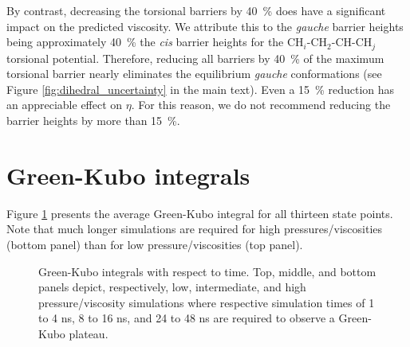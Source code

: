 \documentclass[preprint,review,11pt]{elsarticle}
\begin{document}
	By contrast, decreasing the torsional barriers by 40~\% does have a significant impact on the predicted viscosity. We attribute this to the \textit{gauche} barrier heights being approximately 40~\% the \textit{cis} barrier heights for the CH$_i$-CH$_2$-CH-CH$_j$ torsional potential. Therefore, reducing all barriers by 40~\% of the maximum torsional barrier nearly eliminates the equilibrium \textit{gauche} conformations (see Figure \ref{fig:dihedral_uncertainty} in the main text). Even a 15~\% reduction has an appreciable effect on $\eta$. For this reason, we do not recommend reducing the barrier heights by more than 15~\%.	
	
	\clearpage
	\newpage
	
	\section{Green-Kubo integrals} \label{SI:Running integrals}
		
	Figure \ref{fig:running_integrals} presents the average Green-Kubo integral for all thirteen state points. Note that much longer simulations are required for high pressures/viscosities (bottom panel) than for low pressure/viscosities (top panel). 	
	
	\begin{figure}[htb!]
		\centering
		\caption{Green-Kubo integrals with respect to time. Top, middle, and bottom panels depict, respectively, low, intermediate, and high pressure/viscosity simulations where respective simulation times of 1 to 4 ns, 8 to 16 ns, and 24 to 48 ns are required to observe a Green-Kubo plateau.}
		\label{fig:running_integrals}
	\end{figure}

		
%		
%	
%	
%	
	
\end{document}
